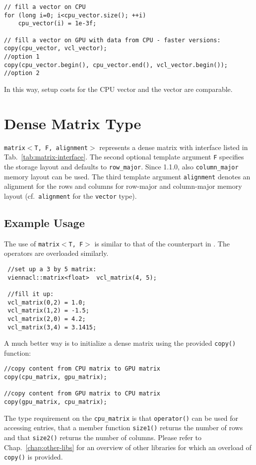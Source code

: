   \begin{lstlisting}
// fill a vector on CPU
for (long i=0; i<cpu_vector.size(); ++i)
    cpu_vector(i) = 1e-3f;

// fill a vector on GPU with data from CPU - faster versions:
copy(cpu_vector, vcl_vector);                                   //option 1
copy(cpu_vector.begin(), cpu_vector.end(), vcl_vector.begin()); //option 2
\end{lstlisting} 
In this way, setup costs for the CPU vector and the {\ViennaCL} vector are comparable.

\section{Dense Matrix Type}
\texttt{matrix$<$T, F, alignment$>$} represents a dense matrix with interface listed in
Tab.~\ref{tab:matrix-interface}. The second optional template argument \texttt{F}
specifies the storage layout and defaults to \texttt{row\_major}. Since {\ViennaCL} 1.1.0, also \lstinline|column_major| memory layout can be used.
The third template argument \texttt{alignment} denotes an alignment for the rows and columns for row-major and column-major memory layout (cf.~\texttt{alignment} for the \texttt{vector} type).

\subsection{Example Usage}
The use of \texttt{matrix$<$T, F$>$} is similar to that of the counterpart in {\ublas}. The operators are overloaded similarly.

\begin{lstlisting}
 //set up a 3 by 5 matrix:
 viennacl::matrix<float>  vcl_matrix(4, 5);

 //fill it up:
 vcl_matrix(0,2) = 1.0; 
 vcl_matrix(1,2) = -1.5; 
 vcl_matrix(2,0) = 4.2; 
 vcl_matrix(3,4) = 3.1415; 
\end{lstlisting} 


A much better way is to initialize a dense matrix using the provided \texttt{copy()} function:
\begin{lstlisting}
//copy content from CPU matrix to GPU matrix
copy(cpu_matrix, gpu_matrix);

//copy content from GPU matrix to CPU matrix
copy(gpu_matrix, cpu_matrix);
\end{lstlisting} 
The type requirement on the \texttt{cpu\_matrix} is that \texttt{operator()} can be used for accessing entries, that a member function \texttt{size1()} returns the number of rows and that \texttt{size2()} returns the number of columns.
Please refer to Chap.~\ref{chap:other-libs} for an overview of other libraries for which an overload of \texttt{copy()} is provided.

